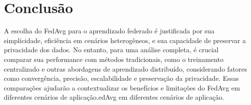 \section{Conclusão}

A escolha do FedAvg para o aprendizado federado é justificada por sua simplicidade, eficiência em cenários heterogêneos, e sua capacidade de preservar a privacidade dos dados. No entanto, para uma análise completa, é crucial comparar sua performance com métodos tradicionais, como o treinamento centralizado e outras abordagens de aprendizado distribuído, considerando fatores como convergência, precisão, escalabilidade e preservação da privacidade. Essas comparações ajudarão a contextualizar os benefícios e limitações do FedAvg em diferentes cenários de aplicação.edAvg em diferentes cenários de aplicação.